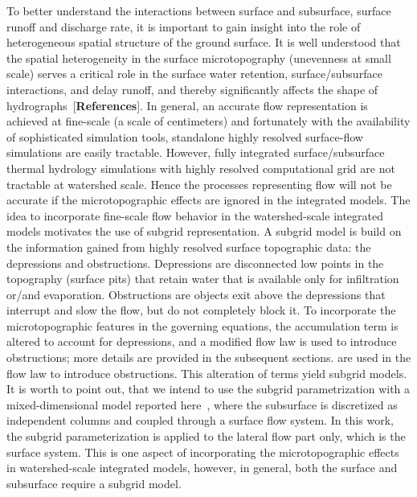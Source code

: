 \documentclass[review,11pt]{elsarticle}
\begin{document}
To better understand the interactions between surface and subsurface, surface runoff and discharge rate, it is important to gain insight into the role of
heterogeneous spatial structure of the ground surface.
It is well understood that the spatial heterogeneity in the surface microtopography (unevenness at small scale) serves a critical role in the surface water retention, surface/subsurface interactions, and delay runoff, and thereby significantly affects the shape of hydrographs~\cite{huang2009influences}[\textbf{References}]. In general, an accurate flow representation is achieved at fine-scale (a scale of centimeters) and fortunately with the availability of sophisticated simulation tools, standalone highly resolved surface-flow simulations are easily tractable. However, fully integrated surface/subsurface thermal hydrology simulations with highly resolved computational grid are not tractable at watershed scale. Hence the processes representing flow will not be accurate if the microtopographic effects are ignored in the integrated models. The idea to incorporate fine-scale flow behavior in the watershed-scale integrated models motivates the use of subgrid representation.
A subgrid model is build on the information gained from highly resolved surface topographic data: the depressions and obstructions. Depressions are disconnected low points in the topography (surface pits) that retain water that is available only for infiltration or/and evaporation. Obstructions are objects exit above the depressions that interrupt and slow the flow, but do not completely block it. To incorporate the microtopographic features in the governing equations, the accumulation term is altered to account for depressions, and a modified flow law is used to introduce obstructions; more details are provided in the subsequent sections. 
are used in the flow law to introduce obstructions. This alteration of terms yield subgrid models. It is worth to point out, that we intend to use the subgrid parametrization with a mixed-dimensional model reported here~\cite{jan2017}, where the subsurface is discretized as independent columns and coupled through a surface flow system. In this work, the subgrid parameterization is applied to the lateral flow part only, which is the surface system. This is one aspect of incorporating the microtopographic effects in watershed-scale integrated models, however, in general, both the surface and subsurface require a subgrid model. 
\end{document}
